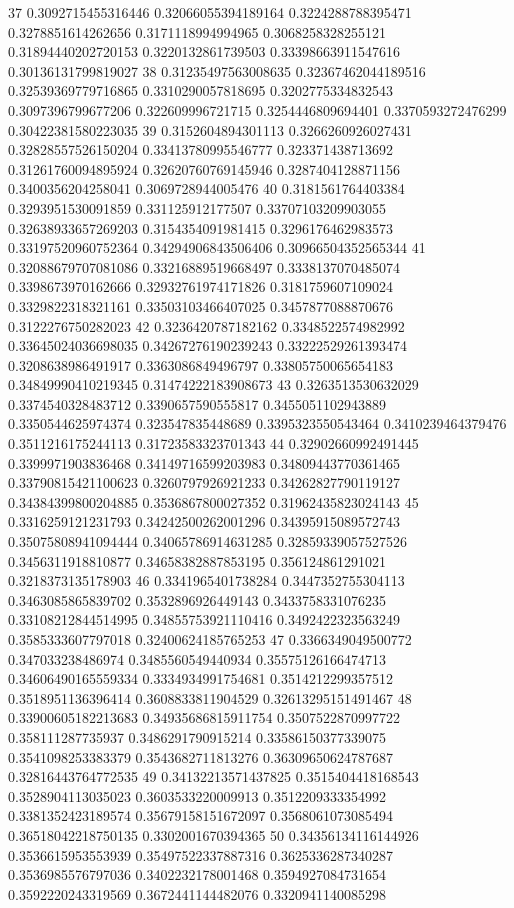 37 0.3092715455316446 0.32066055394189164 0.3224288788395471 0.3278851614262656 0.3171118994994965 0.3068258328255121 0.31894440202720153 0.3220132861739503 0.33398663911547616 0.30136131799819027
38 0.31235497563008635 0.32367462044189516 0.32539369779716865 0.3310290057818695 0.3202775334832543 0.3097396799677206 0.322609996721715 0.3254446809694401 0.3370593272476299 0.30422381580223035
39 0.3152604894301113 0.3266260926027431 0.32828557526150204 0.33413780995546777 0.323371438713692 0.31261760094895924 0.32620760769145946 0.3287404128871156 0.3400356204258041 0.3069728944005476
40 0.3181561764403384 0.3293951530091859 0.331125912177507 0.33707103209903055 0.32638933657269203 0.3154354091981415 0.3296176462983573 0.33197520960752364 0.34294906843506406 0.30966504352565344
41 0.32088679707081086 0.33216889519668497 0.3338137070485074 0.3398673970162666 0.32932761974171826 0.3181759607109024 0.3329822318321161 0.33503103466407025 0.3457877088870676 0.3122276750282023
42 0.3236420787182162 0.3348522574982992 0.33645024036698035 0.34267276190239243 0.33222529261393474 0.3208638986491917 0.3363086849496797 0.33805750065654183 0.34849990410219345 0.31474222183908673
43 0.3263513530632029 0.3374540328483712 0.3390657590555817 0.3455051102943889 0.3350544625974374 0.323547835448689 0.3395323550543464 0.3410239464379476 0.3511216175244113 0.31723583323701343
44 0.32902660992491445 0.3399971903836468 0.34149716599203983 0.34809443770361465 0.33790815421100623 0.3260797926921233 0.34262827790119127 0.34384399800204885 0.3536867800027352 0.31962435823024143
45 0.3316259121231793 0.34242500262001296 0.34395915089572743 0.35075808941094444 0.34065786914631285 0.32859339057527526 0.3456311918810877 0.34658382887853195 0.356124861291021 0.3218373135178903
46 0.3341965401738284 0.3447352755304113 0.3463085865839702 0.3532896926449143 0.3433758331076235 0.33108212844514995 0.34855753921110416 0.3492422323563249 0.3585333607797018 0.32400624185765253
47 0.3366349049500772 0.347033238486974 0.3485560549440934 0.35575126166474713 0.34606490165559334 0.3334934991754681 0.3514212299357512 0.3518951136396414 0.3608833811904529 0.32613295151491467
48 0.33900605182213683 0.34935686815911754 0.3507522870997722 0.358111287735937 0.3486291790915214 0.33586150377339075 0.3541098253383379 0.3543682711813276 0.36309650624787687 0.32816443764772535
49 0.34132213571437825 0.3515404418168543 0.3528904113035023 0.3603533220009913 0.3512209333354992 0.3381352423189574 0.35679158151672097 0.3568061073085494 0.36518042218750135 0.3302001670394365
50 0.34356134116144926 0.3536615953553939 0.35497522337887316 0.3625336287340287 0.3536985576797036 0.3402232178001468 0.3594927084731654 0.3592220243319569 0.3672441144482076 0.3320941140085298
